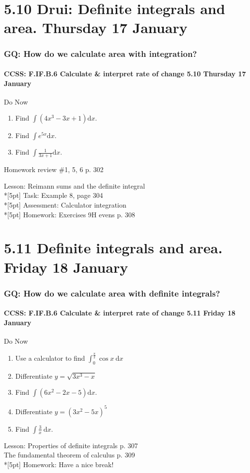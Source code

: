\documentclass{beamer}
\begin{document}
\section{5.10 Drui: Definite integrals and area. Thursday 17 January}
  \frame
  {
    \frametitle{GQ: How do we calculate area with integration?}
    \framesubtitle{CCSS: F.IF.B.6 Calculate \& interpret rate of change \hfill \alert{5.10 Thursday 17 January}}

    \begin{block}{Do Now}
    \begin{enumerate}
        \item Find $\int{(4x^3-3x+1)}\mathrm{d}x$.
        \item Find $\int e^{5x}\mathrm{d}x$.
        \item Find $\displaystyle \int \frac{1}{3x+1} \mathrm{d}x$.
    \end{enumerate}
    Homework review \#1, 5, 6 p. 302
    \end{block}
    Lesson: Reimann sums and the definite integral\\*[5pt]
    Task: Example 8, page 304\\*[5pt]
    Assessment: Calculator integration \\*[5pt]
    Homework: Exercises 9H evens p. 308
  }

\section{5.11 Definite integrals and area. Friday 18 January}
  \frame
  {
    \frametitle{GQ: How do we calculate area with definite integrals?}
    \framesubtitle{CCSS: F.IF.B.6 Calculate \& interpret rate of change \hfill \alert{5.11 Friday 18 January}}

    \begin{block}{Do Now}
    \begin{enumerate}
        \item Use a calculator to find $\displaystyle \int_0^{\frac{\pi}{2}}{\cos x}\ \mathrm{d}x$
        \item Differentiate $y=\sqrt{3x^3-x}$
        \item Find $\int{(6x^2-2x-5)}\mathrm{d}x$.
        \item Differentiate $y={(3x^2-5x)^5}$
        \item Find $\displaystyle \int \frac{3}{x}\ \mathrm{d}x$.
    \end{enumerate}
    \end{block}
    Lesson: Properties of definite integrals p. 307\\
    The fundamental theorem of calculus p. 309\\*[5pt]
    Homework: Have a nice break!
  }
\end{document}
